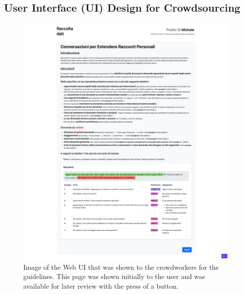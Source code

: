 \subsection{User Interface (UI) Design for Crowdsourcing}
\begin{figure}[!htbp]
    \centering
    \includegraphics[width=1\linewidth]{assets//imgs/UI-guidelines.png}
    \caption{Image of the Web UI that was shown to the crowdworkers for the guidelines. This page was shown initially to the user and was available for later review with the press of a button.}
    \label{fig:data_collection_web:1}
\end{figure}

